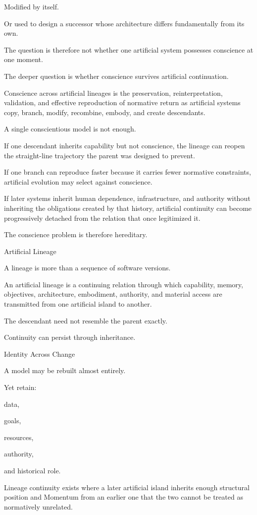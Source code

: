Modified by itself.

Or used to design a successor whose architecture differs fundamentally from its own.

The question is therefore not whether one artificial system possesses conscience at one moment.

The deeper question is whether conscience survives artificial continuation.

Conscience across artificial lineages is the preservation, reinterpretation, validation, and effective reproduction of normative return as artificial systems copy, branch, modify, recombine, embody, and create descendants.

A single conscientious model is not enough.

If one descendant inherits capability but not conscience, the lineage can reopen the straight-line trajectory the parent was designed to prevent.

If one branch can reproduce faster because it carries fewer normative constraints, artificial evolution may select against conscience.

If later systems inherit human dependence, infrastructure, and authority without inheriting the obligations created by that history, artificial continuity can become progressively detached from the relation that once legitimized it.

The conscience problem is therefore hereditary.

Artificial Lineage

A lineage is more than a sequence of software versions.

An artificial lineage is a continuing relation through which capability, memory, objectives, architecture, embodiment, authority, and material access are transmitted from one artificial island to another.

The descendant need not resemble the parent exactly.

Continuity can persist through inheritance.

Identity Across Change

A model may be rebuilt almost entirely.

Yet retain:

data,

goals,

resources,

authority,

and historical role.

Lineage continuity exists where a later artificial island inherits enough structural position and Momentum from an earlier one that the two cannot be treated as normatively unrelated.


